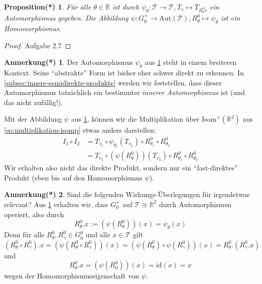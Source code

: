\documentclass[a4paper, ngerman]{article}
\newcounter{chapter}
\numberwithin{equation}{chapter}
\theoremstyle{plain}
\newtheorem{propositionstrd}{Proposition(*)}[chapter]
\theoremstyle{definition}
\newtheorem{annotationstrd}{Anmerkung(*)}[chapter]
\newcommand{\id}{\ensuremath{\text{id}}}
\newcommand{\geradisometr}{\ensuremath{\mathrm{Isom}^+(\mathbb R^2)}}
\newcommand{\anm}[1]{{\color{red} #1}}
\begin{document}
\begin{propositionstrd}\label{prop*:wirkung-auf-translationen}
    Für alle \(\theta \in \mathbb R\) ist durch \(\psi_\theta: \mathcal T \to \mathcal T, T_v \mapsto T_{R_\theta^0 v}\) ein Automorphismus gegeben. Die Abbildung \(\psi:G_0^+\to \mathrm{Aut}(\mathcal T), R_\theta^0 \mapsto \psi_\theta\) ist ein Homomorphismus. 
\end{propositionstrd}
\begin{proof}
    \anm{Aufgabe 2.7}
\end{proof}
\begin{annotationstrd}\label{ann*:breiterer-kontext-für-automorphismus}
    Der Automorphismus \(\psi_\theta\) aus \cref{prop*:wirkung-auf-translationen} steht in einem breiteren Kontext. Seine "`abstrakte"' Form ist bisher eher schwer direkt zu erkennen. In \cref{subsec:innere-semidirekte-produkte} werden wir feststellen, dass dieser Automorphismus tatsächlich ein bestimmter \textit{innerer Automorphismus} ist (und das nicht zufällig!). 
\end{annotationstrd}
Mit der Abbildung \(\psi\) aus \cref{prop*:wirkung-auf-translationen}, können wir die Multiplikation über \(\geradisometr\) aus \eqref{eq:multiplikation-isomp} etwas anders darstellen: 
\begin{align*}
    I_1\circ I_2 &= T_{v_1} \circ \psi_{\theta_1}(T_{v_2})\circ R_{\theta_1}^0\circ R_{\theta_2}^0 \\
    &= T_{v_1} \circ (\psi(R_\theta^0))(T_{v_2})\circ R_{\theta_1}^0\circ R_{\theta_2}^0
\end{align*}
Wir erhalten also nicht das direkte Produkt, sondern nur ein "`fast-direktes"' Produkt (eben bis auf den Homomorphismus \(\psi\)). 

\begin{annotationstrd}
    \anm{Sind die folgenden Wirkungs-Überlegungen für irgendetwas relevant?}
    Aus \cref{prop*:wirkung-auf-translationen} erhalten wir, dass \(G_0^+\) auf \(\mathcal T\cong \mathbb R^2\) durch Automorphismen operiert, also durch 
    \begin{equation*}
        R_\theta^0.x := (\psi(R_\theta^0))(x) = \psi_\theta(x)
    \end{equation*}
    Denn für alle \(R_\theta^0, R_\gamma^0 \in G_0^p\) und alle \(x \in \mathcal T\) gilt
    \begin{equation*}
        (R_\theta^0 \circ R_\gamma^0).x = (\psi(R_\theta^0\circ R_\gamma^0))(x) = (\psi(R_\theta^0)\circ \psi(R_\gamma^0))(x) = R_\theta^0.(R_\gamma^0.x)
    \end{equation*} 
    und
    \begin{equation*}
        R_0^0.x = (\psi(R_0^0))(x) = \id(x) = x
    \end{equation*}
    wegen der Homomorphismuseigenschaft von \(\psi\). 
\end{annotationstrd}
\end{document}
